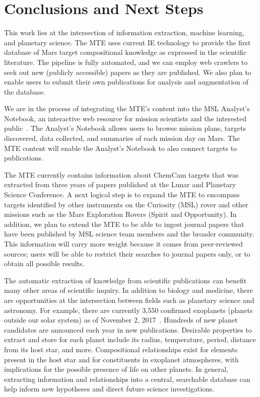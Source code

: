 \documentclass[letterpaper]{article} %
\begin{document}

\section{Conclusions and Next Steps}

This work lies at the intersection of information extraction, machine
learning, and planetary science.  The MTE uses current IE technology
to provide the first database of Mars target compositional knowledge
as expressed in the scientific literature.  The pipeline is fully
automated, and we can employ web crawlers to seek out new (publicly
accessible) papers as they are published.  We also plan to enable
users to submit their own publications for analysis and augmentation
of the database.

We are in the process of integrating the MTE's content into the MSL
Analyst's Notebook, an interactive web resource for mission scientists
and the interested public~\cite{stein:msl-an13}.  The Analyst's
Notebook allows users to 
browse mission plans, targets discovered, data collected, and
summaries of each mission day on Mars.  The MTE content will enable
the Analyst's Notebook to also connect targets to publications.

The MTE currently contains information about ChemCam targets that was
extracted from three years of papers published at the Lunar and
Planetary Science Conference.  A next logical step is to expand the
MTE to encompass targets identified by other instruments on the
Curiosity (MSL) rover and other missions such as the Mars Exploration
Rovers (Spirit and Opportunity).  In addition, we plan to extend the
MTE to be able to ingest journal papers that have been published by
MSL science team members and the broader community.  This information
will carry more weight because it comes from peer-reviewed sources; users
will be able to restrict their searches to journal papers only, or to
obtain all possible results.

The automatic extraction of knowledge from scientific publications can
benefit many other areas of scientific inquiry.  In addition to
biology and medicine, there are opportunities at the intersection
between fields such as planetary science and astronomy.  For example,
there are currently 3,550 confirmed exoplanets (planets outside our
solar system) as of November 2, 2017~\cite{ipac:exo}.  Hundreds of new
planet candidates are announced each year in new publications.
Desirable properties to extract and store for each planet include its
radius, temperature, period, distance from its host star, and more.
Compositional relationships exist for elements present in the
host star and for constituents in exoplanet atmospheres, with
implications for the possible presence of life on other planets.
In general, extracting information and relationships into a central,
searchable database can help inform new hypotheses and direct future
science investigations.
\end{document}
